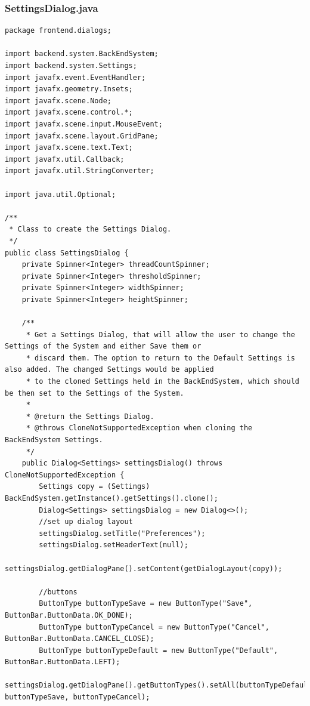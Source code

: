 \subsubsection{SettingsDialog.java}
\begin{lstlisting}
package frontend.dialogs;

import backend.system.BackEndSystem;
import backend.system.Settings;
import javafx.event.EventHandler;
import javafx.geometry.Insets;
import javafx.scene.Node;
import javafx.scene.control.*;
import javafx.scene.input.MouseEvent;
import javafx.scene.layout.GridPane;
import javafx.scene.text.Text;
import javafx.util.Callback;
import javafx.util.StringConverter;

import java.util.Optional;

/**
 * Class to create the Settings Dialog.
 */
public class SettingsDialog {
    private Spinner<Integer> threadCountSpinner;
    private Spinner<Integer> thresholdSpinner;
    private Spinner<Integer> widthSpinner;
    private Spinner<Integer> heightSpinner;

    /**
     * Get a Settings Dialog, that will allow the user to change the Settings of the System and either Save them or
     * discard them. The option to return to the Default Settings is also added. The changed Settings would be applied
     * to the cloned Settings held in the BackEndSystem, which should be then set to the Settings of the System.
     *
     * @return the Settings Dialog.
     * @throws CloneNotSupportedException when cloning the BackEndSystem Settings.
     */
    public Dialog<Settings> settingsDialog() throws CloneNotSupportedException {
        Settings copy = (Settings) BackEndSystem.getInstance().getSettings().clone();
        Dialog<Settings> settingsDialog = new Dialog<>();
        //set up dialog layout
        settingsDialog.setTitle("Preferences");
        settingsDialog.setHeaderText(null);
        settingsDialog.getDialogPane().setContent(getDialogLayout(copy));

        //buttons
        ButtonType buttonTypeSave = new ButtonType("Save", ButtonBar.ButtonData.OK_DONE);
        ButtonType buttonTypeCancel = new ButtonType("Cancel", ButtonBar.ButtonData.CANCEL_CLOSE);
        ButtonType buttonTypeDefault = new ButtonType("Default", ButtonBar.ButtonData.LEFT);
        settingsDialog.getDialogPane().getButtonTypes().setAll(buttonTypeDefault, buttonTypeSave, buttonTypeCancel);


\end{lstlisting}
